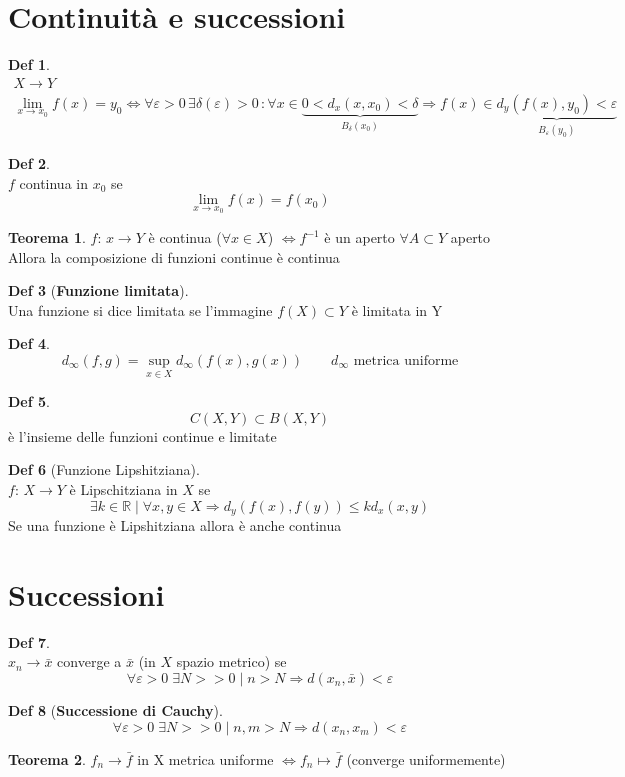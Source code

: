 \documentclass[a4paper,11pt]{report}
\theoremstyle{remark}
\theoremstyle{definition}
\newtheorem*{teo}{Teorema}
\newtheorem*{Def}{Def}
\newcommand{\R}{\mathbb{R}}
\begin{document}
\section{Continuità e successioni}
\begin{Def}
	\begin{gather*}
		X \rightarrow Y \\
		\lim_{x \to x_0} f(x) = y_0 \iff \forall \varepsilon>0 \, \exists \delta(\varepsilon)>0 \,: \forall x \in \underbrace{0<d_x(x,x_0)<\delta}_{B_\delta (x_0)} \Rightarrow f(x)\in \underbrace{d_y(f(x),y_0)<\varepsilon}_{ B_\varepsilon (y_0)}
	\end{gather*}
\end{Def}
\begin{Def}\hfil\\
	$f$ continua in $x_0$ se
	\[\lim_ {x \to x_0} f(x) =f(x_0)\]
\end{Def}
\begin{teo}
	$f: \, x \rightarrow Y$ è continua ($\forall x \in X$) $\iff f^{-1}$ è un aperto $\forall A \subset Y$ aperto \newline
	Allora la composizione di funzioni continue è continua
\end{teo}
\begin{Def}[\textbf{Funzione limitata}]\hfill\\
	Una funzione si dice limitata se l'immagine $f(X) \subset Y$ è limitata in Y 
\end{Def}
\begin{Def}
	\[d_\infty (f,g) = \sup_{x \in X} d_\infty (f(x),g(x)) \qquad d_\infty \text{ metrica uniforme}\]
\end{Def}
\begin{Def}
	\[C(X,Y) \subset B(X,Y)\]
	è l'insieme delle funzioni continue e limitate
\end{Def}
\begin{Def}[Funzione Lipshitziana]\hfill\\
	$f:\, X\rightarrow Y$ è Lipschitziana in $X$ se 
	\[\exists k \in \R \; | \; \forall x,y \in X \Rightarrow d_y (f(x),f(y)) \leq k d_x(x,y)\]
	Se una funzione è Lipshitziana allora è anche continua
\end{Def}
\section{Successioni}
\begin{Def}\hfil\\
$x_n \to \bar{x}$ converge a $\bar{x}$ (in $X$ spazio metrico) se 
\[\forall \varepsilon>0 \; \exists N >>0 \;|\; n>N \Rightarrow d(x_n,\bar{x}) <\varepsilon\]
\end{Def}
\begin{Def}[\textbf{Successione di Cauchy}]
	\[\forall \varepsilon>0 \; \exists N>>0 \;|\; n,m>N \Rightarrow d(x_n,x_m)<\varepsilon\]
\end{Def}
\begin{teo}
	$f_n \to \bar{f}$ in X metrica uniforme $\iff f_n \mapsto \bar{f}$ (converge uniformemente)
\end{teo}
\end{document}
